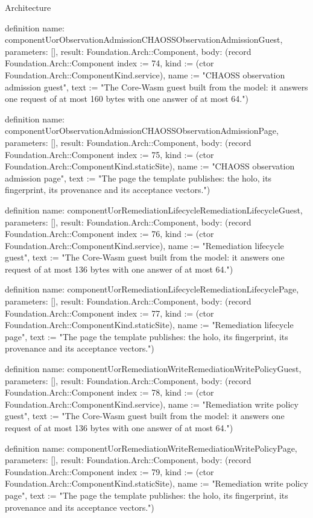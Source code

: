 \begin{lexlean}{Architecture}
\begin{semanticmodule}
definition{
  name: componentUorObservationAdmissionCHAOSSObservationAdmissionGuest,
  parameters: [],
  result: Foundation.Arch::Component,
  body: (record Foundation.Arch::Component {index := 74, kind := (ctor Foundation.Arch::ComponentKind.service), name := "CHAOSS observation admission guest", text := "The Core-Wasm guest built from the model: it answers one request of at most 160 bytes with one answer of at most 64."})
}

definition{
  name: componentUorObservationAdmissionCHAOSSObservationAdmissionPage,
  parameters: [],
  result: Foundation.Arch::Component,
  body: (record Foundation.Arch::Component {index := 75, kind := (ctor Foundation.Arch::ComponentKind.staticSite), name := "CHAOSS observation admission page", text := "The page the template publishes: the holo, its fingerprint, its provenance and its acceptance vectors."})
}

definition{
  name: componentUorRemediationLifecycleRemediationLifecycleGuest,
  parameters: [],
  result: Foundation.Arch::Component,
  body: (record Foundation.Arch::Component {index := 76, kind := (ctor Foundation.Arch::ComponentKind.service), name := "Remediation lifecycle guest", text := "The Core-Wasm guest built from the model: it answers one request of at most 136 bytes with one answer of at most 64."})
}

definition{
  name: componentUorRemediationLifecycleRemediationLifecyclePage,
  parameters: [],
  result: Foundation.Arch::Component,
  body: (record Foundation.Arch::Component {index := 77, kind := (ctor Foundation.Arch::ComponentKind.staticSite), name := "Remediation lifecycle page", text := "The page the template publishes: the holo, its fingerprint, its provenance and its acceptance vectors."})
}

definition{
  name: componentUorRemediationWriteRemediationWritePolicyGuest,
  parameters: [],
  result: Foundation.Arch::Component,
  body: (record Foundation.Arch::Component {index := 78, kind := (ctor Foundation.Arch::ComponentKind.service), name := "Remediation write policy guest", text := "The Core-Wasm guest built from the model: it answers one request of at most 136 bytes with one answer of at most 64."})
}

definition{
  name: componentUorRemediationWriteRemediationWritePolicyPage,
  parameters: [],
  result: Foundation.Arch::Component,
  body: (record Foundation.Arch::Component {index := 79, kind := (ctor Foundation.Arch::ComponentKind.staticSite), name := "Remediation write policy page", text := "The page the template publishes: the holo, its fingerprint, its provenance and its acceptance vectors."})
}


\end{semanticmodule}
\end{lexlean}
